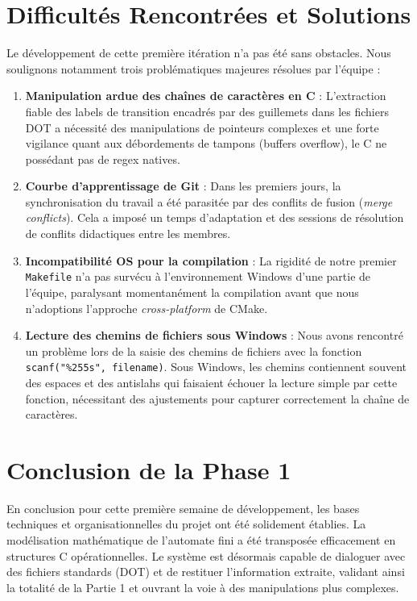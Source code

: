 \documentclass[12pt,a4paper]{article}
\begin{document}
\section{Difficultés Rencontrées et Solutions}
Le développement de cette première itération n'a pas été sans obstacles. Nous soulignons notamment trois problématiques majeures résolues par l'équipe :

\begin{enumerate}
\item \textbf{Manipulation ardue des chaînes de caractères en C} : L'extraction fiable des labels de transition encadrés par des guillemets dans les fichiers DOT a nécessité des manipulations de pointeurs complexes et une forte vigilance quant aux débordements de tampons (buffers overflow), le C ne possédant pas de regex natives.
\item \textbf{Courbe d'apprentissage de Git} : Dans les premiers jours, la synchronisation du travail a été parasitée par des conflits de fusion (\textit{merge conflicts}). Cela a imposé un temps d'adaptation et des sessions de résolution de conflits didactiques entre les membres.
\item \textbf{Incompatibilité OS pour la compilation} : La rigidité de notre premier \texttt{Makefile} n'a pas survécu à l'environnement Windows d'une partie de l'équipe, paralysant momentanément la compilation avant que nous n'adoptions l'approche \textit{cross-platform} de CMake.
\item \textbf{Lecture des chemins de fichiers sous Windows} : Nous avons rencontré un problème lors de la saisie des chemins de fichiers avec la fonction \\ \texttt{scanf("\%255s", filename)}. Sous Windows, les chemins contiennent souvent des espaces et des antislahs qui faisaient échouer la lecture simple par cette fonction, nécessitant des ajustements pour capturer correctement la chaîne de caractères.
\end{enumerate}

\section{Conclusion de la Phase 1}
En conclusion pour cette première semaine de développement, les bases techniques et organisationnelles du projet ont été solidement établies. La modélisation mathématique de l'automate fini a été transposée efficacement en structures C opérationnelles. Le système est désormais capable de dialoguer avec des fichiers standards (DOT) et de restituer l'information extraite, validant ainsi la totalité de la Partie 1 et ouvrant la voie à des manipulations plus complexes.
\end{document}
